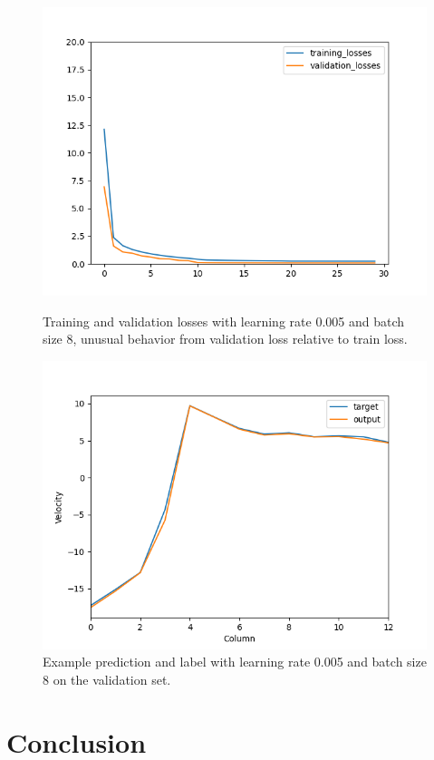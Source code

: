 \documentclass[10pt,conference]{IEEEtran}
\begin{document}
\begin{figure}[h]
  \centering
  \begin{minipage}[h]{0.23\textwidth}
    \includegraphics[width=\textwidth]{images/validation.png}
    \caption{Training and validation losses with learning rate 0.005 and batch size 8, unusual behavior from validation loss relative to train loss.}
    \label{figure:validation}
  \end{minipage}
  \hfill
  \begin{minipage}[h]{0.23\textwidth}
    \includegraphics[width=\textwidth]{images/predictions.png}
    \caption{Example prediction and label with learning rate 0.005 and batch size 8 on the validation set.}
    \label{figure:predictions}
  \end{minipage}
\end{figure}


\section{Conclusion}



\end{document}
